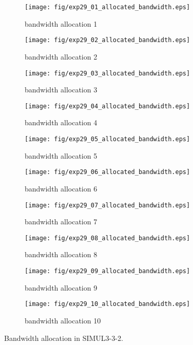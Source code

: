 	\begin{figure}
		\begin{center}
			\begin{subfigure}[b]{0.32\textwidth}
				\texttt{[image: fig/exp29\_01\_allocated\_bandwidth.eps]}
				\caption{bandwidth allocation 1}
				\label{figure:simul3_3_2_b_a}
			\end{subfigure}
			\begin{subfigure}[b]{0.32\textwidth}
				\texttt{[image: fig/exp29\_02\_allocated\_bandwidth.eps]}
				\caption{bandwidth allocation 2}
				\label{figure:simul3_3_2_b_b}
			\end{subfigure}
			\begin{subfigure}[b]{0.32\textwidth}
				\texttt{[image: fig/exp29\_03\_allocated\_bandwidth.eps]}
				\caption{bandwidth allocation 3}
				\label{figure:simul3_3_2_b_c}
			\end{subfigure}
			\begin{subfigure}[b]{0.32\textwidth}
				\texttt{[image: fig/exp29\_04\_allocated\_bandwidth.eps]}
				\caption{bandwidth allocation 4}
				\label{figure:simul3_3_2_b_d}
			\end{subfigure}
			\begin{subfigure}[b]{0.32\textwidth}
				\texttt{[image: fig/exp29\_05\_allocated\_bandwidth.eps]}
				\caption{bandwidth allocation 5}
				\label{figure:simul3_3_2_b_e}
			\end{subfigure}
			\begin{subfigure}[b]{0.32\textwidth}
				\texttt{[image: fig/exp29\_06\_allocated\_bandwidth.eps]}
				\caption{bandwidth allocation 6}
				\label{figure:simul3_3_2_b_f}
			\end{subfigure}
			\begin{subfigure}[b]{0.32\textwidth}
				\texttt{[image: fig/exp29\_07\_allocated\_bandwidth.eps]}
				\caption{bandwidth allocation 7}
				\label{figure:simul3_3_2_b_g}
			\end{subfigure}
			\begin{subfigure}[b]{0.32\textwidth}
				\texttt{[image: fig/exp29\_08\_allocated\_bandwidth.eps]}
				\caption{bandwidth allocation 8}
				\label{figure:simul3_3_2_b_h}
			\end{subfigure}
			\begin{subfigure}[b]{0.32\textwidth}
				\texttt{[image: fig/exp29\_09\_allocated\_bandwidth.eps]}
				\caption{bandwidth allocation 9}
				\label{figure:simul3_3_2_b_i}
			\end{subfigure}
			\begin{subfigure}[b]{0.32\textwidth}
				\texttt{[image: fig/exp29\_10\_allocated\_bandwidth.eps]}
				\caption{bandwidth allocation 10}
				\label{figure:simul3_3_2_b_j}
			\end{subfigure}
			\caption{Bandwidth allocation in SIMUL3-3-2.}
			\label{figure:simul3_3_2_ba}
		\end{center}
	\end{figure}


